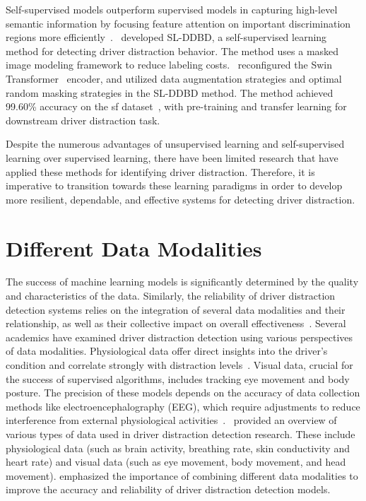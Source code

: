 Self-supervised models outperform supervised models in capturing high-level semantic information by focusing feature attention on important discrimination regions more efficiently~\citep{masked_image_modeling_dd_zhang2023novel}.~\citet{masked_image_modeling_dd_zhang2023novel} developed SL-DDBD, a self-supervised learning method for detecting driver distraction behavior. The method uses a masked image modeling framework to reduce labeling costs.~\citet{masked_image_modeling_dd_zhang2023novel} reconfigured the Swin Transformer~\citep{swin_transformer_paper_liu2021swin} encoder, and utilized data augmentation strategies and optimal random masking strategies in the SL-DDBD method. The method achieved 99.60\% accuracy on the \gls{sf} dataset~\citep{statefarm2016}, with pre-training and transfer learning for downstream driver distraction task.

Despite the numerous advantages of unsupervised learning and self-supervised learning over supervised learning, there have been limited research that have applied these methods for identifying driver distraction. Therefore, it is imperative to transition towards these learning paradigms in order to develop more resilient, dependable, and effective systems for detecting driver distraction.

\section{Different Data Modalities}
The success of machine learning models is significantly determined by the quality and characteristics of the data. Similarly, the reliability of driver distraction detection systems relies on the integration of several data modalities and their relationship, as well as their collective impact on overall effectiveness~\citep{RA_2023_dd_article}. Several academics have examined driver distraction detection using various perspectives of data modalities. Physiological data offer direct insights into the driver's condition and correlate strongly with distraction levels~\citep{RA_52_reimer2011impact,RA_89_son2021effects, RA_133_almahasneh2014deep, RA_134_lin2011eeg}. Visual data, crucial for the success of supervised algorithms, includes tracking eye movement and body posture. The precision of these models depends on the accuracy of data collection methods like electroencephalography (EEG), which require adjustments to reduce interference from external physiological activities~\citep{RA_144_lin2005eeg, RA_145_lakshmi2014survey}.~\citet{RA_2023_dd_article} provided an overview of various types of data used in driver distraction detection research. These include physiological data (such as brain activity, breathing rate, skin conductivity and heart rate) and visual data (such as eye movement, body movement, and head movement). \citet{RA_2023_dd_article} emphasized the importance of combining different data modalities to improve the accuracy and reliability of driver distraction detection models. 

